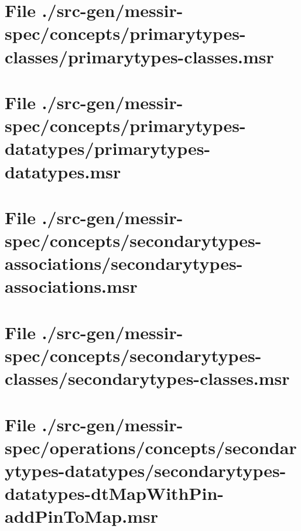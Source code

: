 \section[File /src-gen/messir-spec/concepts/primarytypes-classes/primarytypes-classes.msr]{File ./src-gen/messir-spec/concepts/primarytypes-classes/primarytypes-classes.msr}
\scriptsize

\normalsize
	
\section[File /src-gen/messir-spec/concepts.../primarytypes-datatypes.msr]{File ./src-gen/messir-spec/concepts/primarytypes-datatypes/primarytypes-datatypes.msr}
\scriptsize

\normalsize
	
\section[File /src-gen/messir-spec/concepts.../secondarytypes-associations.msr]{File ./src-gen/messir-spec/concepts/secondarytypes-associations/secondarytypes-associations.msr}
\scriptsize

\normalsize
	
\section[File /src-gen/messir-spec/concepts.../secondarytypes-classes.msr]{File ./src-gen/messir-spec/concepts/secondarytypes-classes/secondarytypes-classes.msr}
\scriptsize

\normalsize
	
\section[File /src-gen.../secondarytypes-datatypes-dtMapWithPin-addPinToMap.msr]{File ./src-gen/messir-spec/operations/concepts/secondarytypes-datatypes/secondarytypes-datatypes-dtMapWithPin-addPinToMap.msr}
\scriptsize

\normalsize
	
